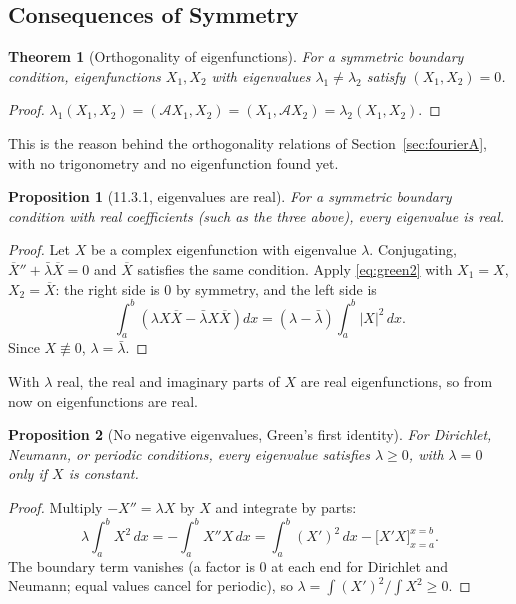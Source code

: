 \documentclass{article}
\newtheorem{theorem}{Theorem}
\newtheorem{proposition}{Proposition}
\begin{document}
\subsection{Consequences of Symmetry}
\begin{theorem}[Orthogonality of eigenfunctions]
    For a symmetric boundary condition, eigenfunctions $X_1, X_2$ with eigenvalues $\lambda_1 \neq \lambda_2$ satisfy $(X_1, X_2) = 0$.
\end{theorem}
\begin{proof}
    $\lambda_1(X_1,X_2) = (\mathcal{A}X_1, X_2) = (X_1, \mathcal{A}X_2) = \lambda_2(X_1,X_2)$.
\end{proof}
This is the reason behind the orthogonality relations of Section~\ref{sec:fourierA}, with no trigonometry and no eigenfunction found yet.
\begin{proposition}[11.3.1, eigenvalues are real]
    For a symmetric boundary condition with real coefficients (such as the three above), every eigenvalue is real.
\end{proposition}
\begin{proof}
    Let $X$ be a complex eigenfunction with eigenvalue $\lambda$. Conjugating, $\overline{X}'' + \bar\lambda\overline{X} = 0$ and $\overline{X}$ satisfies the same condition. Apply \eqref{eq:green2} with $X_1 = X$, $X_2 = \overline{X}$: the right side is $0$ by symmetry, and the left side is
    \begin{equation}
        \int_a^b\left(\lambda X\overline{X} - \bar\lambda X\overline{X}\right)dx = (\lambda - \bar\lambda)\int_a^b|X|^2\,dx.
    \end{equation}
    Since $X \not\equiv 0$, $\lambda = \bar\lambda$.
\end{proof}
With $\lambda$ real, the real and imaginary parts of $X$ are real eigenfunctions, so from now on eigenfunctions are real.
\begin{proposition}[No negative eigenvalues, Green's first identity]
    For Dirichlet, Neumann, or periodic conditions, every eigenvalue satisfies $\lambda \geq 0$, with $\lambda = 0$ only if $X$ is constant.
\end{proposition}
\begin{proof}
    Multiply $-X'' = \lambda X$ by $X$ and integrate by parts:
    \begin{equation}\label{eq:green1}
        \lambda\int_a^b X^2\,dx = -\int_a^b X''X\,dx = \int_a^b (X')^2\,dx - \Big[X'X\Big]_{x=a}^{x=b}.
    \end{equation}
    The boundary term vanishes (a factor is $0$ at each end for Dirichlet and Neumann; equal values cancel for periodic), so $\lambda = \int(X')^2/\int X^2 \geq 0$.
\end{proof}
\end{document}
